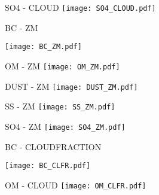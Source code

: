 \documentclass{beamer}
\begin{document}
\begin{frame}{SO4 - CLOUD}
\texttt{[image: SO4\_CLOUD.pdf]} 
\end{frame}


\begin{frame}{BC - ZM}
\begin{center}
\texttt{[image: BC\_ZM.pdf]} 
\end{center}
\end{frame}


\begin{frame}{OM - ZM}
\texttt{[image: OM\_ZM.pdf]} 
\end{frame}


\begin{frame}{DUST - ZM}
\texttt{[image: DUST\_ZM.pdf]} 
\end{frame}


\begin{frame}{SS - ZM}
\texttt{[image: SS\_ZM.pdf]} 
\end{frame}

\begin{frame}{SO4 - ZM}
\texttt{[image: SO4\_ZM.pdf]} 
\end{frame}


\begin{frame}{BC - CLOUDFRACTION}
\begin{center}
\texttt{[image: BC\_CLFR.pdf]} 
\end{center}
\end{frame}


\begin{frame}{OM - CLOUD}
\texttt{[image: OM\_CLFR.pdf]} 
\end{frame}
\end{document}
